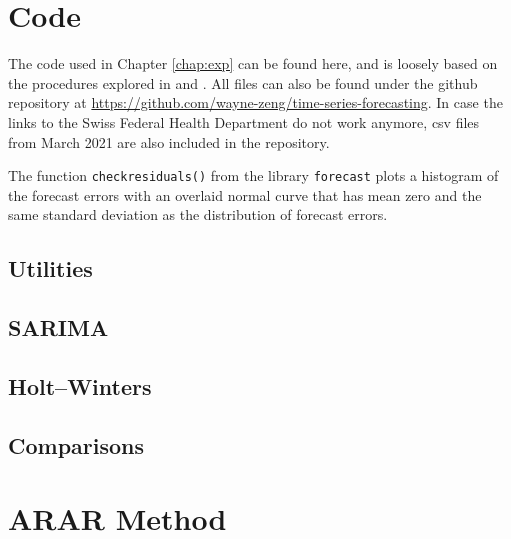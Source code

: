\documentclass[a4paper, oneside]{discothesis}
\begin{document}
\newpage 






\appendix
\chapter{Code} \label{chap:Code}
The code used in Chapter \ref{chap:exp} can be found here, and is loosely based on the procedures explored in \cite{fpp2} and \cite{little_ts}. All files can also be found under the github repository at \url{https://github.com/wayne-zeng/time-series-forecasting}. In case the links to the Swiss Federal Health Department do not work anymore, csv files from March 2021 are also included in the repository. 

The function \texttt{checkresiduals()} from the library \texttt{forecast} plots a histogram of the forecast errors with an overlaid normal curve that has mean zero and the same standard deviation as the distribution of forecast errors.

\section{Utilities}

\section{SARIMA}

\section{Holt--Winters}

\section{Comparisons}


\chapter{ARAR Method}
\end{document}
